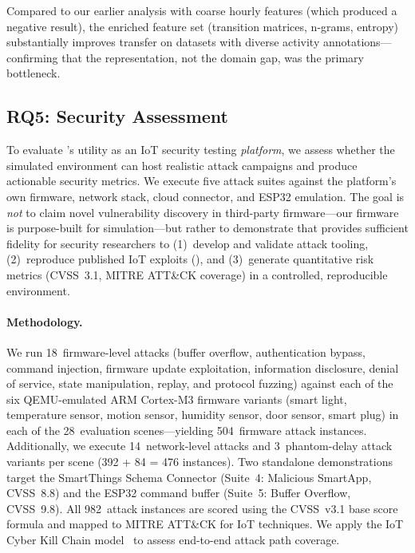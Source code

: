 Compared to our earlier analysis with coarse hourly features
(which produced a negative result), the enriched feature set
(transition matrices, n-grams, entropy) substantially improves
transfer on datasets with diverse activity annotations---confirming
that the representation, not the domain gap, was the primary
bottleneck.

\subsection{RQ5: Security Assessment}\label{sec:eval-rq5}

To evaluate \sys{}'s utility as an IoT security testing \emph{platform},
we assess whether the simulated environment can host realistic
attack campaigns and produce actionable security metrics.
We execute five attack suites against the platform's own firmware,
network stack, cloud connector, and ESP32 emulation.
The goal is \emph{not} to claim novel vulnerability discovery in
third-party firmware---our firmware is purpose-built for
simulation---but rather to demonstrate that \sys{} provides
sufficient fidelity for security researchers to
(1)~develop and validate attack tooling,
(2)~reproduce published IoT exploits (),
and (3)~generate quantitative risk metrics (CVSS~3.1, MITRE ATT\&CK
coverage) in a controlled, reproducible environment.

\paragraph{Methodology.}
We run 18~firmware-level attacks (buffer overflow, authentication
bypass, command injection, firmware update exploitation, information
disclosure, denial of service, state manipulation, replay, and
protocol fuzzing) against each of the six QEMU-emulated ARM
Cortex-M3 firmware variants (smart light, temperature sensor,
motion sensor, humidity sensor, door sensor, smart plug) in each
of the 28~evaluation scenes---yielding 504~firmware attack instances.
Additionally, we execute 14~network-level attacks and 3~phantom-delay
attack variants per scene (392 + 84 = 476 instances).
Two standalone demonstrations target the SmartThings Schema Connector
(Suite~4: Malicious SmartApp, CVSS~8.8) and the ESP32 command buffer
(Suite~5: Buffer Overflow, CVSS~9.8).  All 982~attack instances are
scored using the CVSS~v3.1 base score formula and mapped to MITRE
ATT\&CK for IoT techniques.  We apply the IoT Cyber Kill Chain
model~\cite{iotkilchain} to assess end-to-end attack path coverage.

